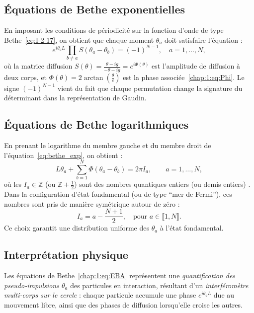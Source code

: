 
\subsection{Équations de Bethe exponentielles}

En imposant les conditions de périodicité sur la fonction d’onde de type Bethe~\eqref{eq:I-2-17}, on obtient que chaque moment $\theta_a$ doit satisfaire l’équation :
\begin{equation}
	e^{i \theta_a L} \prod_{b \ne a} S(\theta_a - \theta_b) = (-1)^{N-1}, \quad a = 1, \dots, N,
	\label{eq:bethe_exp}
\end{equation}
où la matrice diffusion $S(\theta) = \frac{\theta - i g}{-\theta - i g} = e^{i \Phi(\theta)}$ est l’amplitude de diffusion à deux corps, et $\Phi(\theta) = 2 \arctan\left( \frac{\theta}{c} \right)$ est la phase associée~\eqref{chap:1:eq:Phi}. Le signe $(-1)^{N-1}$ vient du fait que chaque permutation change la signature du déterminant dans la représentation de Gaudin.

\subsection{Équations de Bethe logarithmiques}

En prenant le logarithme du membre gauche et du membre droit de l’équation~\eqref{eq:bethe_exp}, on obtient :
\begin{equation}\label{chap:1:eq:EBA}
	L \theta_a + \sum_{b=1}^N \Phi(\theta_a - \theta_b) = 2\pi I_a, \qquad a = 1, \dots, N,
\end{equation}
où les $I_a \in \mathbb{Z}$ (ou $\mathbb{Z} + \tfrac{1}{2}$) sont des nombres quantiques entiers (ou demis entiers) . Dans la configuration d’état fondamental (ou de type “mer de Fermi”), ces nombres sont pris de manière symétrique autour de zéro :
\[
I_a = a - \frac{N+1}{2}, \quad \text{pour } a \in \llbracket 1 , N \rrbracket.
\]
Ce choix garantit une distribution uniforme des $\theta_a$ à l’état fondamental.

\subsection{Interprétation physique}

Les équations de Bethe~\eqref{chap:1:eq:EBA} représentent une {\em quantification des pseudo‑impulsions $\theta_a$} des particules en interaction, résultant d’un {\em interféromètre multi‑corps sur le cercle} : chaque particule accumule une phase $e^{i \theta_a L}$ due au mouvement libre, ainsi que des phases de diffusion lorsqu’elle croise les autres.

